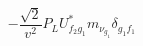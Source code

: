 %
\begin{dmath*}
%
  -  \frac{\sqrt{2}}{v^2}P_L U_{f_2 g_1}^* m_{\nu_{g_1}} \delta_{g_1 f_1}
%
\end{dmath*}
%

